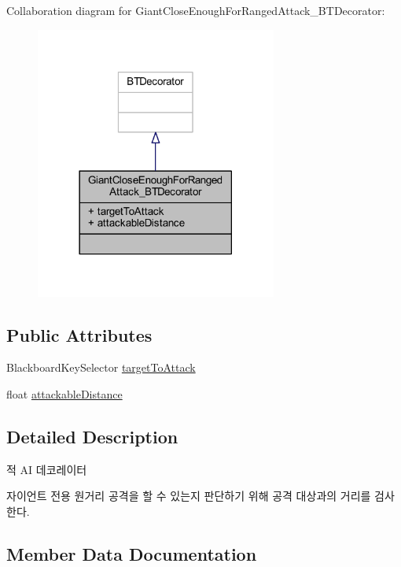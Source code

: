 Collaboration diagram for Giant\+Close\+Enough\+For\+Ranged\+Attack\+\_\+\+B\+T\+Decorator\+:\nopagebreak
\begin{figure}[H]
\begin{center}
\leavevmode
\includegraphics[width=225pt]{class_giant_close_enough_for_ranged_attack___b_t_decorator__coll__graph}
\end{center}
\end{figure}
\subsection*{Public Attributes}
\begin{DoxyCompactItemize}
\item 
Blackboard\+Key\+Selector \hyperlink{class_giant_close_enough_for_ranged_attack___b_t_decorator_a1cc248f03397ce0e086ac9b16bd732e1}{target\+To\+Attack}
\item 
float \hyperlink{class_giant_close_enough_for_ranged_attack___b_t_decorator_a994ad90e6d00df363f635eee1fcf2146}{attackable\+Distance}
\end{DoxyCompactItemize}


\subsection{Detailed Description}
적 AI 데코레이터 

자이언트 전용 원거리 공격을 할 수 있는지 판단하기 위해 공격 대상과의 거리를 검사한다. 

\subsection{Member Data Documentation}
